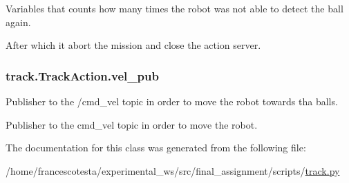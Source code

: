 Variables that counts how many times the robot was not able to detect the ball again. 

After which it abort the mission and close the action server. 
\subsubsection[{\texorpdfstring{vel\+\_\+pub}{vel_pub}}]{\setlength{\rightskip}{0pt plus 5cm}track.\+Track\+Action.\+vel\+\_\+pub\hspace{0.3cm}{\ttfamily [static]}}\hypertarget{classtrack_1_1TrackAction_af6105c2cad0d325296213d7c03c4fb6e}{}\label{classtrack_1_1TrackAction_af6105c2cad0d325296213d7c03c4fb6e}


Publisher to the /cmd\+\_\+vel topic in order to move the robot towards tha balls. 

Publisher to the cmd\+\_\+vel topic in order to move the robot. 

The documentation for this class was generated from the following file\+:\begin{DoxyCompactItemize}
\item 
/home/francescotesta/experimental\+\_\+ws/src/final\+\_\+assignment/scripts/\hyperlink{track_8py}{track.\+py}\end{DoxyCompactItemize}
